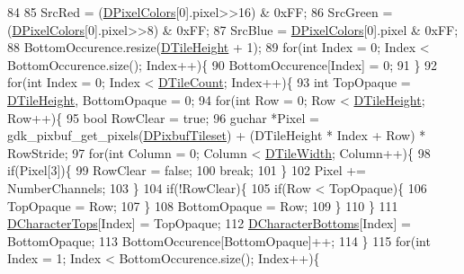 \begin{DoxyCode}
{84         
85         SrcRed = (\hyperlink{classCGraphicTileset_a4e9672b8b133dbac600fb8bb400d1cb3}{DPixelColors}[0].pixel>>16) & 0xFF;
86         SrcGreen = (\hyperlink{classCGraphicTileset_a4e9672b8b133dbac600fb8bb400d1cb3}{DPixelColors}[0].pixel>>8) & 0xFF;
87         SrcBlue = \hyperlink{classCGraphicTileset_a4e9672b8b133dbac600fb8bb400d1cb3}{DPixelColors}[0].pixel & 0xFF;
88         BottomOccurence.resize(\hyperlink{classCGraphicTileset_af48f32e07d5fe69afd5f764318cc3244}{DTileHeight} + 1);
89         \textcolor{keywordflow}{for}(\textcolor{keywordtype}{int} Index = 0; Index < BottomOccurence.size(); Index++)\{
90             BottomOccurence[Index] = 0;
91         \}
92         \textcolor{keywordflow}{for}(\textcolor{keywordtype}{int} Index = 0; Index < \hyperlink{classCGraphicTileset_a39d942b370e47f441bf97385eb1037c8}{DTileCount}; Index++)\{
93             \textcolor{keywordtype}{int} TopOpaque = \hyperlink{classCGraphicTileset_af48f32e07d5fe69afd5f764318cc3244}{DTileHeight}, BottomOpaque = 0;
94             \textcolor{keywordflow}{for}(\textcolor{keywordtype}{int} Row = 0; Row < \hyperlink{classCGraphicTileset_af48f32e07d5fe69afd5f764318cc3244}{DTileHeight}; Row++)\{
95                 \textcolor{keywordtype}{bool} RowClear = \textcolor{keyword}{true};
96                 guchar *Pixel = gdk\_pixbuf\_get\_pixels(\hyperlink{classCGraphicTileset_a5d5adfcdbb347a6df3f57535ca08e3ef}{DPixbufTileset}) + (DTileHeight * Index 
      + Row) * RowStride;
97                 \textcolor{keywordflow}{for}(\textcolor{keywordtype}{int} Column = 0; Column < \hyperlink{classCGraphicTileset_a2d0c7d19865b81911a3a43d5cae50e00}{DTileWidth}; Column++)\{
98                     \textcolor{keywordflow}{if}(Pixel[3])\{
99                         RowClear = \textcolor{keyword}{false};
100                         \textcolor{keywordflow}{break};      
101                     \}
102                     Pixel += NumberChannels;   
103                 \}
104                 \textcolor{keywordflow}{if}(!RowClear)\{
105                     \textcolor{keywordflow}{if}(Row < TopOpaque)\{
106                         TopOpaque = Row;
107                     \}
108                     BottomOpaque = Row;
109                 \}
110             \}
111             \hyperlink{classCFontTileset_aa009ebe41a491d854a5f6005919649c2}{DCharacterTops}[Index] = TopOpaque;
112             \hyperlink{classCFontTileset_a13d7063022d59bf3347452c78be50a8b}{DCharacterBottoms}[Index] = BottomOpaque;
113             BottomOccurence[BottomOpaque]++;
114         \}
115         \textcolor{keywordflow}{for}(\textcolor{keywordtype}{int} Index = 1; Index < BottomOccurence.size(); Index++)\{
}
\end{DoxyCode}
